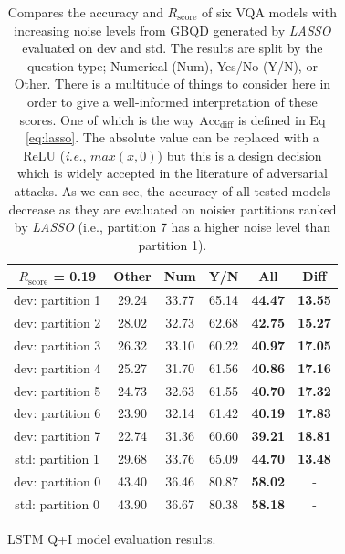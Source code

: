 \documentclass[letterpaper]{article}
\newcommand{\ie}{}\def\ie/{{\em i.e.}}
\newcommand{\lasso}{}\def\lasso/{\textit{LASSO}}
\newcommand{\rscore}{}\def\rscore/{$R_{\text{score}}$}
\begin{document}
\begin{table}
\begin{subtable}{0.49\linewidth}
		\begin{adjustbox}{width=0.46\columnwidth}
\begin{tabular}{c | c c c c | c}
			\rscore/ = 0.19  & Other & Num   & Y/N   & All            & Diff           \\ [0.5ex]
			\hline
			dev: partition 1 & 29.24 & 33.77 & 65.14 & \textbf{44.47} & \textbf{13.55} \\
			dev: partition 2 & 28.02 & 32.73 & 62.68 & \textbf{42.75} & \textbf{15.27} \\
			dev: partition 3 & 26.32 & 33.10 & 60.22 & \textbf{40.97} & \textbf{17.05} \\
			dev: partition 4 & 25.27 & 31.70 & 61.56 & \textbf{40.86} & \textbf{17.16} \\
			dev: partition 5 & 24.73 & 32.63 & 61.55 & \textbf{40.70} & \textbf{17.32} \\
			dev: partition 6 & 23.90 & 32.14 & 61.42 & \textbf{40.19} & \textbf{17.83} \\
			dev: partition 7 & 22.74 & 31.36 & 60.60 & \textbf{39.21} & \textbf{18.81} \\
			\hline
			std: partition 1 & 29.68 & 33.76 & 65.09 & \textbf{44.70} & \textbf{13.48} \\
			\hline
			dev: partition 0 & 43.40 & 36.46 & 80.87 & \textbf{58.02} & -              \\
			std: partition 0 & 43.90 & 36.67 & 80.38 & \textbf{58.18} & -              \\
			\hline
		\end{tabular}
\end{adjustbox}
		\caption{LSTM Q+I model evaluation results.}
	\end{subtable}
	\caption{Compares the accuracy and \rscore/ of six VQA models with increasing noise levels from GBQD generated by \lasso/ evaluated on dev and std. The results are split by the question type; Numerical (Num), Yes/No (Y/N), or Other. There is a multitude of things to consider here in order to give a well-informed interpretation of these scores. One of which is the way $\text{Acc}_\text{diff}$ is defined in Eq \ref{eq:lasso}. The absolute value can be replaced with a ReLU (\ie/, $max(x, 0)$) but this is a design decision which is widely accepted in the literature of adversarial attacks. As we can see, the accuracy of all tested models decrease as they are evaluated on noisier partitions ranked by \lasso/ (i.e., partition 7 has a higher noise level than partition 1).}
	\label{tbl:lasso_gbqd}
\end{table}
\end{document}
